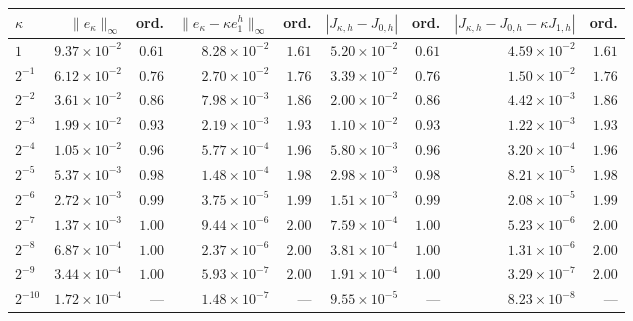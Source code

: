 \begin{tabular}{lrrrrrrrr}
\toprule
$\kappa$ & $\|e_\kappa\|_\infty$ & ord. & $\|e_\kappa-\kappa e_1^h\|_\infty$ & ord. & $|J_{\kappa,h}-J_{0,h}|$ & ord. & $|J_{\kappa,h}-J_{0,h}-\kappa J_{1,h}|$ & ord.\\
\midrule
$1$ & $9.37\times10^{-2}$ & $0.61$ & $8.28\times10^{-2}$ & $1.61$ & $5.20\times10^{-2}$ & $0.61$ & $4.59\times10^{-2}$ & $1.61$\\
$2^{-1}$ & $6.12\times10^{-2}$ & $0.76$ & $2.70\times10^{-2}$ & $1.76$ & $3.39\times10^{-2}$ & $0.76$ & $1.50\times10^{-2}$ & $1.76$\\
$2^{-2}$ & $3.61\times10^{-2}$ & $0.86$ & $7.98\times10^{-3}$ & $1.86$ & $2.00\times10^{-2}$ & $0.86$ & $4.42\times10^{-3}$ & $1.86$\\
$2^{-3}$ & $1.99\times10^{-2}$ & $0.93$ & $2.19\times10^{-3}$ & $1.93$ & $1.10\times10^{-2}$ & $0.93$ & $1.22\times10^{-3}$ & $1.93$\\
$2^{-4}$ & $1.05\times10^{-2}$ & $0.96$ & $5.77\times10^{-4}$ & $1.96$ & $5.80\times10^{-3}$ & $0.96$ & $3.20\times10^{-4}$ & $1.96$\\
$2^{-5}$ & $5.37\times10^{-3}$ & $0.98$ & $1.48\times10^{-4}$ & $1.98$ & $2.98\times10^{-3}$ & $0.98$ & $8.21\times10^{-5}$ & $1.98$\\
$2^{-6}$ & $2.72\times10^{-3}$ & $0.99$ & $3.75\times10^{-5}$ & $1.99$ & $1.51\times10^{-3}$ & $0.99$ & $2.08\times10^{-5}$ & $1.99$\\
$2^{-7}$ & $1.37\times10^{-3}$ & $1.00$ & $9.44\times10^{-6}$ & $2.00$ & $7.59\times10^{-4}$ & $1.00$ & $5.23\times10^{-6}$ & $2.00$\\
$2^{-8}$ & $6.87\times10^{-4}$ & $1.00$ & $2.37\times10^{-6}$ & $2.00$ & $3.81\times10^{-4}$ & $1.00$ & $1.31\times10^{-6}$ & $2.00$\\
$2^{-9}$ & $3.44\times10^{-4}$ & $1.00$ & $5.93\times10^{-7}$ & $2.00$ & $1.91\times10^{-4}$ & $1.00$ & $3.29\times10^{-7}$ & $2.00$\\
$2^{-10}$ & $1.72\times10^{-4}$ & --- & $1.48\times10^{-7}$ & --- & $9.55\times10^{-5}$ & --- & $8.23\times10^{-8}$ & ---\\
\bottomrule
\end{tabular}
